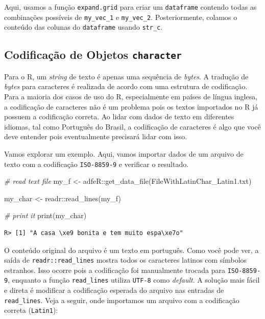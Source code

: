\documentclass[
  11pt,
]{book}
\newenvironment{Shaded}{\begin{snugshade}}{\end{snugshade}}
\newcommand{\CommentTok}[1]{\textcolor[rgb]{0.37,0.37,0.37}{\textit{#1}}}
\newcommand{\FunctionTok}[1]{\textcolor[rgb]{0,0,0}{#1}}
\newcommand{\NormalTok}[1]{#1}
\newcommand{\OtherTok}[1]{\textcolor[rgb]{0.37,0.37,0.37}{#1}}
\newcommand{\SpecialCharTok}[1]{\textcolor[rgb]{0,0,0}{#1}}
\newcommand{\StringTok}[1]{\textcolor[rgb]{0.5,0.5,0.5}{#1}}
\begin{document}
Aqui, usamos a função \texttt{expand.grid} para criar um \texttt{dataframe} contendo todas as combinações possíveis de \texttt{my\_vec\_1} e \texttt{my\_vec\_2}. Posteriormente, colamos o conteúdo das colunas do \texttt{dataframe} usando \texttt{str\_c}.

\hypertarget{codificauxe7uxe3o-de-objetos-character}{%
\subsection{\texorpdfstring{Codificação de Objetos \texttt{character}}{Codificação de Objetos character}}\label{codificauxe7uxe3o-de-objetos-character}}

Para o R, um \emph{string} de texto é apenas uma sequência de \emph{bytes}. A tradução de \emph{bytes} para caracteres é realizada de acordo com uma estrutura de codificação. Para a maioria dos casos de uso do R, especialmente em países de língua inglesa, a codificação de caracteres não é um problema pois os textos importados no R já possuem a codificação correta. Ao lidar com dados de texto em diferentes idiomas, tal como Português do Brasil, a codificação de caracteres é algo que você deve entender pois eventualmente precisará lidar com isso.

Vamos explorar um exemplo. Aqui, vamos importar dados de um arquivo de texto com a codificação \texttt{\textquotesingle{}ISO-8859-9\textquotesingle{}} e verificar o resultado.

\begin{Shaded}
\begin{Highlighting}[]
\CommentTok{\# read text file}
\NormalTok{my\_f }\OtherTok{\textless{}{-}}\NormalTok{ adfeR}\SpecialCharTok{::}\FunctionTok{get\_data\_file}\NormalTok{(}\StringTok{\textquotesingle{}FileWithLatinChar\_Latin1.txt\textquotesingle{}}\NormalTok{)}

\NormalTok{my\_char }\OtherTok{\textless{}{-}}\NormalTok{ readr}\SpecialCharTok{::}\FunctionTok{read\_lines}\NormalTok{(my\_f)}

\CommentTok{\# print it}
\FunctionTok{print}\NormalTok{(my\_char)}
\end{Highlighting}
\end{Shaded}

\begin{verbatim}
R> [1] "A casa \xe9 bonita e tem muito espa\xe7o"
\end{verbatim}

O conteúdo original do arquivo é um texto em português. Como você pode ver, a saída de \texttt{readr::read\_lines} mostra todos os caracteres latinos com símbolos estranhos. Isso ocorre pois a codificação foi manualmente trocada para \texttt{\textquotesingle{}ISO-8859-9\textquotesingle{}}, enquanto a função \texttt{read\_lines} utiliza \texttt{\textquotesingle{}UTF-8\textquotesingle{}} como \emph{default}. A solução mais fácil e direta é modificar a codificação esperada do arquivo nas entradas de \texttt{read\_lines}. Veja a seguir, onde importamos um arquivo com a codificação correta (\texttt{\textquotesingle{}Latin1\textquotesingle{}}):
\end{document}
